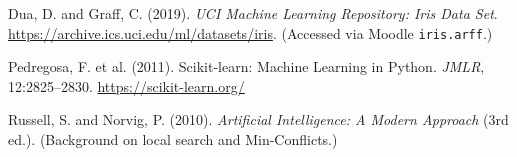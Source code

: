 \documentclass[11pt,a4paper]{article}
\begin{document}
\begin{thebibliography}{9}
Dua, D. and Graff, C. (2019). \emph{UCI Machine Learning Repository: Iris Data Set}. \url{https://archive.ics.uci.edu/ml/datasets/iris}. (Accessed via Moodle \texttt{iris.arff}.)

Pedregosa, F. et al. (2011). Scikit-learn: Machine Learning in Python. \emph{JMLR}, 12:2825--2830. \url{https://scikit-learn.org/}

Russell, S. and Norvig, P. (2010). \emph{Artificial Intelligence: A Modern Approach} (3rd ed.). (Background on local search and Min-Conflicts.)
\end{thebibliography}
\end{document}
